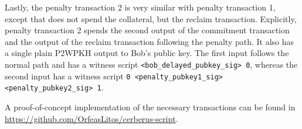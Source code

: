 \documentclass[runningheads]{llncs}
\begin{document}
Lastly, the penalty transaction 2 is very similar with penalty transaction 1, except that does not spend the collateral, but the reclaim transaction. Explicitly, penalty transaction 2 spends the second output of the commitment transaction and the output of the reclaim transaction following the penalty path. It also has a single plain P2WPKH output to Bob's public key. The first input follows the normal path and has a witness script \texttt{<bob\_delayed\_pubkey\_sig> 0}, whereas the second input has a witness script \texttt{0 <penalty\_pubkey1\_sig> <penalty\_pubkey2\_sig> 1}.

A proof-of-concept implementation of the necessary transactions can be found in
\url{https://github.com/OrfeasLitos/cerberus-script}.
 \fi
\end{document}
